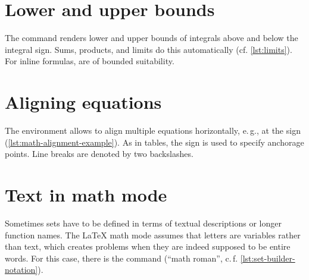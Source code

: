\section{Lower and upper bounds}

The  command renders lower and upper bounds of integrals above and below the integral sign.
Sums, products, and limits do this 
automatically (cf. \cref{lst:limits}).
For inline formulas,  are of bounded suitability.


\section{Aligning equations}

The  environment allows to align multiple equations horizontally, e.\,g., at the \sh{=} sign (\cref{lst:math-alignment-example}).
As in tables, the \sh{\&} sign is used to specify anchorage points.
Line breaks are denoted by two backslashes.


\section{Text in math mode}

Sometimes sets have to be defined in terms of textual descriptions or longer function names.
The \LaTeX{} math mode assumes that letters are variables rather than text, which creates problems when they are indeed supposed to be entire words.
For this case, there is the  command (\enquote{math roman}, c.\,f. \cref{lst:set-builder-notation}).

